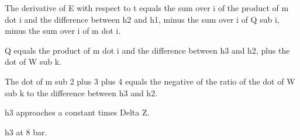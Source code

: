 The derivative of E with respect to t equals the sum over i of the product of m dot i and the difference between h2 and h1, minus the sum over i of Q sub i, minus the sum over i of m dot i.

Q equals the product of m dot i and the difference between h3 and h2, plus the dot of W sub k.

The dot of m sub 2 plus 3 plus 4 equals the negative of the ratio of the dot of W sub k to the difference between h3 and h2.

h3 approaches a constant times Delta Z.

h3 at 8 bar.